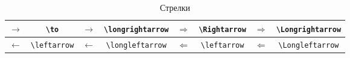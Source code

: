 \begin{table}
	
	\begin{tabular}{|c|c||c|c||c|c||c|c|}
		\hline $\to$ & \Verb|\to| 
		& $\longrightarrow$ & \Verb|\longrightarrow| 
		& $\Rightarrow$ & \Verb|\Rightarrow| 
		& $\Longrightarrow$ & \Verb|\Longrightarrow| \\ 
		\hline $\leftarrow$ & \Verb|\leftarrow| 
		& $\longleftarrow$ & \Verb|\longleftarrow| 
		& $\Leftarrow$ & \Verb|\leftarrow| 
		& $\Longleftarrow$ & \Verb|\Longleftarrow|  \\
		\hline
	\end{tabular}
	\caption{Стрелки}
\end{table}